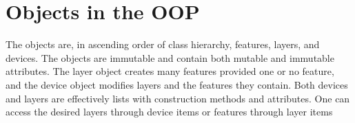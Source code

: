 \documentclass{article}
\begin{document}
\section{Objects in the OOP}
The objects are, in ascending order of class hierarchy, features, layers, and devices. The objects are immutable and contain both mutable and immutable attributes. The layer object creates many features provided one or no feature, and the device object modifies layers and the features they contain. Both devices and layers are effectively lists with construction methods and attributes. One can access the desired layers through device items or features through layer items
\end{document}
